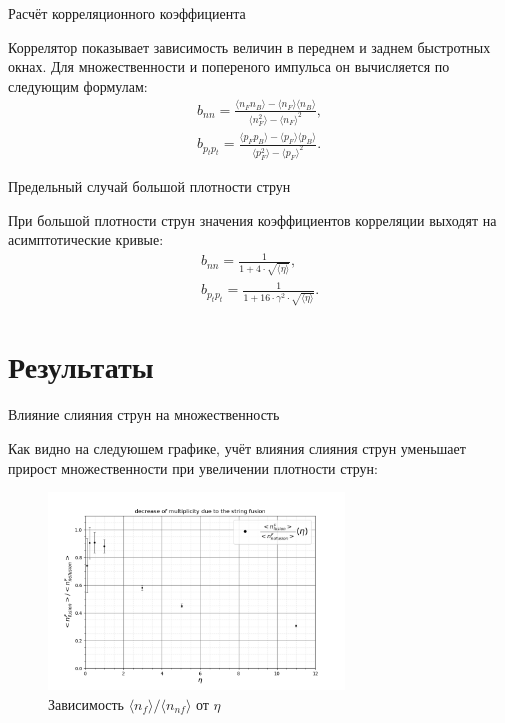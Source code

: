 \documentclass[aspectratio=43]{beamer}
\begin{document}
\begin{frame}{Расчёт корреляционного коэффициента}

	Коррелятор показывает зависимость величин в переднем и заднем быстротных окнах. Для множественности и попереного импульса он вычисляется по следующим формулам:
	\begin{align*}
		b_{nn} = \frac{\langle n_F n_B \rangle - \langle n_F \rangle \langle n_B \rangle}{\langle n_F^2 \rangle - \langle n_F \rangle^2}, \\
		b_{p_tp_t} = \frac{\langle p_F p_B \rangle - \langle p_F \rangle \langle p_B \rangle}{\langle p_F^2 \rangle - \langle p_F \rangle^2}.
	\end{align*}
	
\end{frame}

\begin{frame}{Предельный случай большой плотности струн}

	При большой плотности струн значения коэффициентов корреляции выходят на асимптотические кривые: 
	\begin{align*}
		b_{nn} = \frac{1}{1 + 4 \cdot \sqrt{\langle \eta \rangle}}, \quad \\
		b_{p_tp_t} = \frac{1}{1 + 16 \cdot \gamma^2 \cdot \sqrt{\langle \eta \rangle}}.
	\end{align*}
	
\end{frame}

\section{Результаты}

\begin{frame}{Влияние слияния струн на множественность}
	
	Как видно на следуюшем графике, учёт влияния слияния струн уменьшает прирост множественности при увеличении плотности струн:
	\begin{figure}[H]
		\includegraphics[width=0.7\textwidth]{nn0eta}
		\caption*{Зависимость $\langle n_{f} \rangle / \langle n_{nf} \rangle$ от $\eta$}
		\label{fig:nn0eta}
	\end{figure}

\end{frame}
\end{document}
